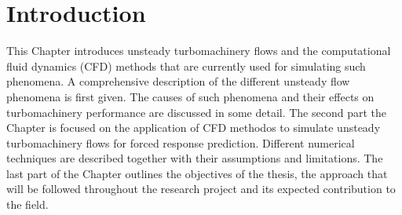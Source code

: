 %
%
%
%
\chapter{Introduction}
\label{introduction_chapter}
%
 This Chapter introduces unsteady turbomachinery flows
 and the computational fluid dynamics (CFD) methods that are currently
 used for simulating such phenomena.
 A comprehensive description of the different unsteady flow phenomena
 is first given. The causes of such phenomena
 and their effects on turbomachinery performance are discussed
 in some detail. The second part the Chapter is focused on
 the application of CFD methodos to simulate
 unsteady turbomachinery flows for forced response prediction.
 Different numerical techniques are described
 together with their assumptions and limitations.
 The last part of the Chapter outlines the objectives
 of the thesis, the approach that will be followed throughout the
 research project and its expected contribution to the field.
%
%
%
%

%

%

%

%
%
